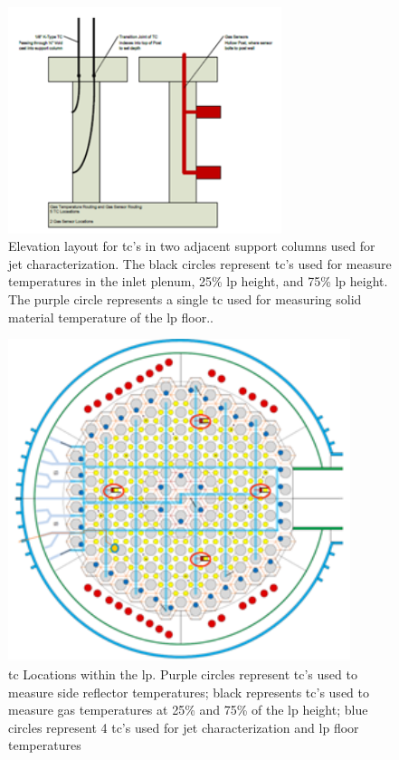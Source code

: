 \documentclass[double,12pt]{beavtex}
\begin{document}
\begin{figure}
    \begin{center}
    	\includegraphics[width=8cm]{Figures/HTTF_LP_PT_Placement_Axial.png}
    	\caption{Elevation layout for \acrshort{tc}'s in two adjacent support columns used for jet characterization. The black circles represent \acrshort{tc}'s used for measure temperatures in the inlet plenum, 25\% \acrshort{lp} height, and 75\% \acrshort{lp} height. The purple circle represents a single \acrshort{tc} used for measuring solid material temperature of the \acrshort{lp} floor..}
    	\label{fig:HTTF_LP_PT_Placement_Axial}
    	\end{center}
\end{figure}

\begin{figure}
    \begin{center}
    	\includegraphics[width=10cm]{Figures/HTTF_LP_PT_Placement_Radial.png}
    	\caption{\acrshort{tc} Locations within the \acrshort{lp}. Purple circles represent \acrshort{tc}'s used to measure side reflector temperatures; black represents \acrshort{tc}'s used to measure gas temperatures at 25\% and 75\% of the \acrshort{lp} height; blue circles represent 4 \acrshort{tc}'s used for jet characterization and \acrshort{lp} floor temperatures}
    	\label{fig:HTTF_LP_PT_Placement_Radial}
    	\end{center}
\end{figure}
\end{document}
